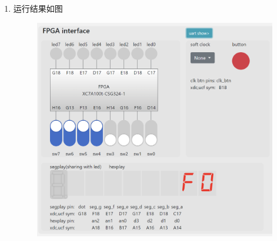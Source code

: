 \documentclass{article}
\begin{document}
\begin{enumerate}
        \clearpage
        \item []运行结果如图
        \begin{figure}[htbp]
            \centering
            \includegraphics[scale=0.7]{r2.png}
        \end{figure}
    \end{enumerate}

    \clearpage
\end{document}
